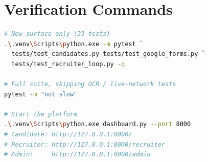 \documentclass[11pt,a4paper]{article}
\begin{document}
\section{Verification Commands}
\label{u:verify}

\begin{lstlisting}[language=bash]
# New surface only (33 tests)
.\.venv\Scripts\python.exe -m pytest `
  tests/test_candidates.py tests/test_google_forms.py `
  tests/test_recruiter_loop.py -q

# Full suite, skipping OCR / live-network tests
pytest -m "not slow"

# Start the platform
.\.venv\Scripts\python.exe dashboard.py --port 8000
# Candidate: http://127.0.0.1:8000/
# Recruiter: http://127.0.0.1:8000/recruiter
# Admin:     http://127.0.0.1:8000/admin
\end{lstlisting}
\end{document}
